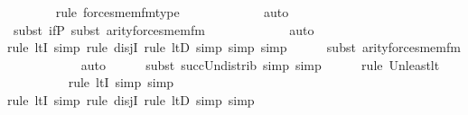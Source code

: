 \begin{isabellebody}
\ \ \ \ \ \ \ \isamarkupfalse%
{\isacharparenleft}{\kern0pt}rule\ forces{\isacharunderscore}{\kern0pt}mem{\isacharunderscore}{\kern0pt}fm{\isacharunderscore}{\kern0pt}type{\isacharparenright}{\kern0pt}\isanewline
\ \ \ \ \ \ \ \ \ \ \ \isamarkupfalse%
\ auto{\isacharbrackleft}{\kern0pt}{}{\isacharbrackright}{\kern0pt}\isanewline
\ \ \ \ \ \isamarkupfalse%
\ {\isacharparenleft}{\kern0pt}subst\ if{\isacharunderscore}{\kern0pt}P{\isacharcomma}{\kern0pt}\ subst\ arity{\isacharunderscore}{\kern0pt}forces{\isacharunderscore}{\kern0pt}mem{\isacharunderscore}{\kern0pt}fm{\isacharparenright}{\kern0pt}\isanewline
\ \ \ \ \ \ \ \ \ \ \ \isamarkupfalse%
\ auto{\isacharbrackleft}{\kern0pt}{}{\isacharbrackright}{\kern0pt}\isanewline
\ \ \ \ \ \ \isamarkupfalse%
{\isacharparenleft}{\kern0pt}rule\ ltI{\isacharcomma}{\kern0pt}\ simp{\isacharcomma}{\kern0pt}\ rule\ disjI{}{\isacharcomma}{\kern0pt}\ rule\ ltD{\isacharcomma}{\kern0pt}\ simp{\isacharcomma}{\kern0pt}\ simp{\isacharcomma}{\kern0pt}\ simp{\isacharparenright}{\kern0pt}\isanewline
\ \ \ \ \ \isamarkupfalse%
{\isacharparenleft}{\kern0pt}subst\ arity{\isacharunderscore}{\kern0pt}forces{\isacharunderscore}{\kern0pt}mem{\isacharunderscore}{\kern0pt}fm{\isacharparenright}{\kern0pt}\isanewline
\ \ \ \ \ \ \ \ \ \ \isamarkupfalse%
\ auto{\isacharbrackleft}{\kern0pt}{}{\isacharbrackright}{\kern0pt}\isanewline
\ \ \ \ \ \isamarkupfalse%
{\isacharparenleft}{\kern0pt}subst\ succ{\isacharunderscore}{\kern0pt}Un{\isacharunderscore}{\kern0pt}distrib{\isacharcomma}{\kern0pt}\ simp{\isacharcomma}{\kern0pt}\ simp{\isacharparenright}{\kern0pt}{\isacharplus}{\kern0pt}\isanewline
\ \ \ \ \ \isamarkupfalse%
{\isacharparenleft}{\kern0pt}rule\ Un{\isacharunderscore}{\kern0pt}least{\isacharunderscore}{\kern0pt}lt{\isacharparenright}{\kern0pt}{\isacharplus}{\kern0pt}\isanewline
\ \ \ \ \ \ \ \ \ \isamarkupfalse%
{\isacharparenleft}{\kern0pt}rule\ ltI{\isacharcomma}{\kern0pt}\ simp{\isacharcomma}{\kern0pt}\ simp{\isacharparenright}{\kern0pt}{\isacharplus}{\kern0pt}\isanewline
\ \ \ \ \ \ \ \isamarkupfalse%
{\isacharparenleft}{\kern0pt}rule\ ltI{\isacharcomma}{\kern0pt}\ simp{\isacharcomma}{\kern0pt}\ rule\ disjI{}{\isacharcomma}{\kern0pt}\ rule\ ltD{\isacharcomma}{\kern0pt}\ simp{\isacharcomma}{\kern0pt}\ simp{\isacharparenright}{\kern0pt}{\isacharplus}{\kern0pt}\isanewline
\ \ \isamarkupfalse%

\end{isabellebody}
